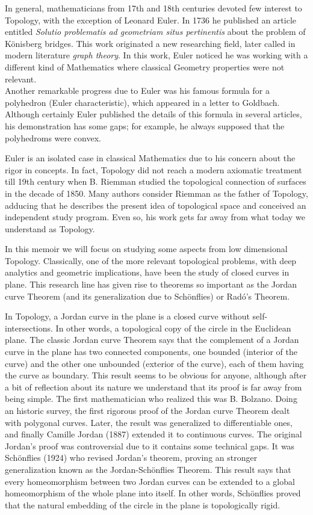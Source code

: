 \documentclass[12pt,a4paper,oldfontcommands]{memoir}
\begin{document}
In general, mathematicians from 17th and 18th centuries devoted few interest to Topology, with the exception of Leonard Euler. In 1736  he published an article entitled {\em Solutio problematis ad geometriam situs pertinentis} about the problem of Könisberg bridges. This work originated a new researching field, later   called in modern literature {\em graph theory}. In this work,  Euler  noticed  he was working with a different kind of Mathematics where classical Geometry properties were not relevant.
\\ Another remarkable progress due to Euler was his famous formula for a polyhedron (Euler characteristic), which appeared in a letter to Goldbach. Although certainly Euler published the details of this formula in several articles, his demonstration has some gaps; for example, he always supposed that the polyhedroms were convex.

  Euler is an isolated case in classical Mathematics due to his concern about the   rigor in  concepts. In fact,  Topology did not reach a modern axiomatic treatment  till 19th century when  B. Riemman studied the topological connection of surfaces in the decade of 1850. Many authors consider Riemman as the father of Topology, adducing that he describes the present idea of topological space and conceived an independent study program. Even so,  his work gets far away from what today we understand as Topology.

In this memoir we will focus on studying some aspects from low dimensional Topology. Classically, one of the more relevant  topological problems, with deep analytics and geometric implications, have been the study of closed curves in plane. This research line has given rise to theorems so important as the Jordan curve Theorem (and its generalization due to Schönflies) or Radó's Theorem.

In Topology, a Jordan curve in the plane is a closed curve  without self-intersections. In other words, a topological copy of the circle in the Euclidean plane. The classic Jordan curve Theorem says that the complement of a Jordan curve in the plane has two connected components, one bounded (interior of the curve) and the other one unbounded (exterior of the curve), each of them having the curve as boundary. This result seems to be obvious for anyone, although after a bit of reflection about its nature we understand that its proof is far away from being simple. The first mathematician who realized   this was B. Bolzano. Doing an historic survey, the first rigorous proof of the Jordan curve Theorem dealt with polygonal curves. Later, the result was generalized to differentiable ones, and finally Camille Jordan (1887) extended it to continuous curves. The original Jordan's proof was controversial due to it contains some technical gaps. It was Schönflies (1924) who revised Jordan's theorem, proving an stronger generalization known as the Jordan-Schönflies Theorem. This result says that every homeomorphism between two Jordan curves can be extended to a global homeomorphism of the whole plane into itself. In other words, Schönflies proved that the natural embedding of the circle in the plane is topologically rigid.
\end{document}
